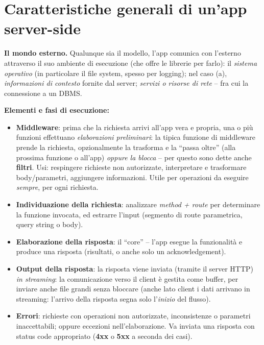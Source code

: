 \section{Caratteristiche generali di un'app server-side}

\textbf{Il mondo esterno.} Qualunque sia il modello, l'app comunica con l'esterno attraverso
il suo ambiente di esecuzione (che offre le librerie per farlo): il \emph{sistema operativo}
(in particolare il file system, spesso per logging); nel caso (a), \emph{informazioni di
contesto} fornite dal server; \emph{servizi o risorse di rete} -- fra cui la connessione a un
DBMS.

\textbf{Elementi e fasi di esecuzione:}
\begin{itemize}
  \item \textbf{Middleware}: prima che la richiesta arrivi all'app vera e propria, una o
        pi\`u funzioni effettuano \emph{elaborazioni preliminari}: la tipica funzione di
        middleware prende la richiesta, opzionalmente la trasforma e la ``passa oltre''
        (alla prossima funzione o all'app) \emph{oppure la blocca} -- per questo sono dette
        anche \textbf{filtri}. Usi: respingere richieste non autorizzate, interpretare e
        trasformare body/parametri, aggiungere informazioni. Utile per operazioni da eseguire
        \emph{sempre}, per ogni richiesta.
  \item \textbf{Individuazione della richiesta}: analizzare \emph{method + route} per
        determinare la funzione invocata, ed estrarre l'input (segmento di route parametrica,
        query string o body).
  \item \textbf{Elaborazione della risposta}: il ``core'' -- l'app esegue la funzionalit\`a e
        produce una risposta (risultati, o anche solo un acknowledgement).
  \item \textbf{Output della risposta}: la risposta viene inviata (tramite il server HTTP)
        \emph{in streaming}: la comunicazione verso il client \`e gestita come buffer, per
        inviare anche file grandi senza bloccare (anche lato client i dati arrivano in
        streaming: l'arrivo della risposta segna solo l'\emph{inizio} del flusso).
  \item \textbf{Errori}: richieste con operazioni non autorizzate, inconsistenze o parametri
        inaccettabili; oppure eccezioni nell'elaborazione. Va inviata una risposta con status
        code appropriato (\textbf{4xx} o \textbf{5xx} a seconda dei casi).
\end{itemize}

